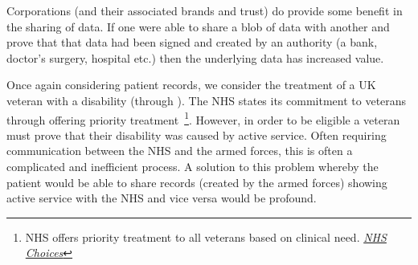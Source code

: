 Corporations (and their associated brands and trust) do provide some benefit in the sharing of data. If one were able to share a blob of data with another and prove that that data had been signed and created by an authority (a bank, doctor's surgery, hospital etc.) then the underlying data has increased value.

Once again considering patient records, we consider the treatment of a UK veteran with a disability (through ). The NHS states its commitment to veterans through offering priority treatment~\footnote{NHS offers priority treatment to all veterans based on clinical need. \href{http://www.nhs.uk/NHSEngland/Militaryhealthcare/veterans-families-reservists/Pages/veterans.aspx}{\textit{NHS Choices}}}. However, in order to be eligible a veteran must prove that their disability was caused by active service. Often requiring communication between the NHS and the armed forces, this is often a complicated and inefficient process. A solution to this problem whereby the patient would be able to share records (created by the armed forces) showing active service with the NHS and vice versa would be profound.

